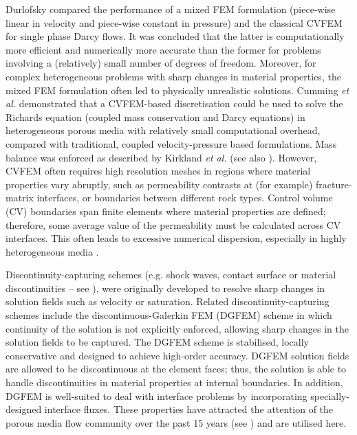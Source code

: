 \documentclass[times]{fldauth}
\begin{document}
Durlofsky \cite{durlofsky_1993,durlofsky_1994} compared the performance of a
mixed FEM formulation (piece-wise linear in velocity and piece-wise
constant in pressure) and the classical CVFEM for single phase Darcy
flows. It was concluded that the latter is computationally more
efficient and numerically more accurate than the former for problems
involving a (relatively) small number of degrees of freedom. Moreover,
for complex heterogeneous problems with sharp changes in material
properties, the mixed FEM formulation often led to physically
unrealistic solutions.  Cumming {\it et al.} \cite{cumming_2011} demonstrated that a
CVFEM-based discretisation could be used to solve the Richards
equation (coupled mass conservation and Darcy equations) in
heterogeneous porous media with relatively small computational
overhead, compared with traditional, coupled velocity-pressure based
formulations.  Mass balance was enforced as described by Kirkland {\it et al.}
\cite{kirkland_1992} (see also \cite{forsyth_1990,cumming_phd2012}). However, CVFEM often requires
high resolution meshes in regions where material properties vary
abruptly, such as permeability contrasts at (for example)
fracture-matrix interfaces, or boundaries between different rock
types. Control volume (CV) boundaries span finite elements where
material properties are defined; therefore, some average value of the
permeability must be calculated across CV interfaces. This often leads
to excessive numerical dispersion, especially in highly heterogeneous
media \cite{nick_2011b, nick_2011a}.

Discontinuity-capturing schemes (e.g. shock waves, contact
  surface or material discontinuities --
  see \cite{brooks_1982,tezduyar_1986}), were originally developed to
resolve sharp changes in solution fields such as velocity or
saturation. Related discontinuity-capturing schemes include the
discontinuous-Galerkin FEM (DGFEM) scheme in which continuity of the
solution is not explicitly enforced, allowing sharp changes in the
solution fields to be captured. The DGFEM scheme is stabilised,
locally conservative and designed to achieve high-order
accuracy. DGFEM solution fields are allowed to be discontinuous at the
element faces; thus, the solution is able to handle discontinuities in
material properties at internal boundaries. In addition, DGFEM is
well-suited to deal with interface problems by incorporating
specially-designed interface fluxes. These properties have attracted
the attention of the porous media flow community over the past 15
years (see \cite{riviere_2000,riviere_2002,bastian_2002}) and are
utilised here.
\end{document}
